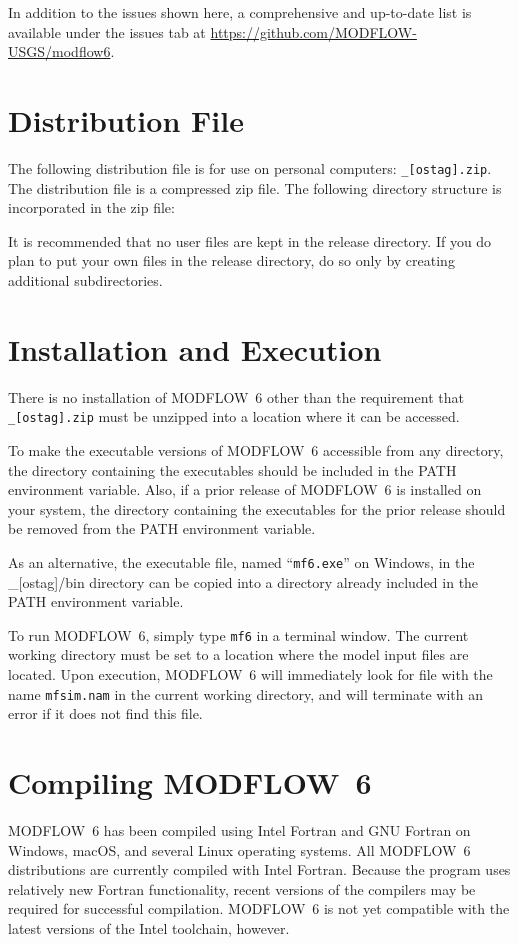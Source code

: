 \documentclass[11pt,twoside,twocolumn]{usgsreport}
\begin{document}
In addition to the issues shown here, a comprehensive and up-to-date list is available under the issues tab at \url{https://github.com/MODFLOW-USGS/modflow6}.


\section{Distribution File}
The following distribution file is for use on personal computers: \texttt{\modflowversion\_[ostag].zip}.  The distribution file is a compressed zip file. The following directory structure is incorporated in the zip file:



It is recommended that no user files are kept in the release directory.  If you do plan to put your own files in the release directory, do so only by creating additional subdirectories.

\section{Installation and Execution}
There is no installation of MODFLOW~6 other than the requirement that \texttt{\modflowversion\_[ostag].zip} must be unzipped into a location where it can be accessed.  

To make the executable versions of MODFLOW~6 accessible from any directory, the directory containing the executables should be included in the PATH environment variable.  Also, if a prior release of MODFLOW~6 is installed on your system, the directory containing the executables for the prior release should be removed from the PATH environment variable.

As an alternative, the executable file, named ``\texttt{mf6.exe}'' on Windows, in the \modflowversion\_[ostag]/bin directory can be copied into a directory already included in the PATH environment variable.

To run MODFLOW~6, simply type \texttt{mf6} in a terminal window.  The current working directory must be set to a location where the model input files are located.  Upon execution, MODFLOW~6 will immediately look for file with the name \texttt{mfsim.nam} in the current working directory, and will terminate with an error if it does not find this file.

\section{Compiling MODFLOW~6}
MODFLOW~6 has been compiled using Intel Fortran and GNU Fortran on Windows, macOS, and several Linux operating systems. All MODFLOW~6 distributions are currently compiled with Intel Fortran. Because the program uses relatively new Fortran functionality, recent versions of the compilers may be required for successful compilation. MODFLOW~6 is not yet compatible with the latest versions of the Intel toolchain, however.
\end{document}
